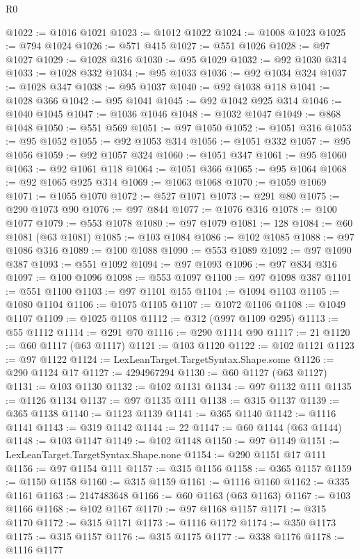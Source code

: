 \begin{lexlean}{R0}
\begin{coremodule}
@1022 := @1016 @1021
@1023 := @1012 @1022
@1024 := @1008 @1023
@1025 := @794 @1024
@1026 := @571 @415
@1027 := @551 @1026
@1028 := @97 @1027
@1029 := @1028 @316
@1030 := @95 @1029
@1032 := @92 @1030 @314
@1033 := @1028 @332
@1034 := @95 @1033
@1036 := @92 @1034 @324
@1037 := @1028 @347
@1038 := @95 @1037
@1040 := @92 @1038 @118
@1041 := @1028 @366
@1042 := @95 @1041
@1045 := @92 @1042 @925 @314
@1046 := @1040 @1045
@1047 := @1036 @1046
@1048 := @1032 @1047
@1049 := @868 @1048
@1050 := @551 @569
@1051 := @97 @1050
@1052 := @1051 @316
@1053 := @95 @1052
@1055 := @92 @1053 @314
@1056 := @1051 @332
@1057 := @95 @1056
@1059 := @92 @1057 @324
@1060 := @1051 @347
@1061 := @95 @1060
@1063 := @92 @1061 @118
@1064 := @1051 @366
@1065 := @95 @1064
@1068 := @92 @1065 @925 @314
@1069 := @1063 @1068
@1070 := @1059 @1069
@1071 := @1055 @1070
@1072 := @527 @1071
@1073 := @291 @80
@1075 := @290 @1073 @90
@1076 := @97 @844
@1077 := @1076 @316
@1078 := @100 @1077
@1079 := @553 @1078
@1080 := @97 @1079
@1081 := 128
@1084 := @60 @1081 (@63 @1081)
@1085 := @103 @1084
@1086 := @102 @1085
@1088 := @97 @1086 @316
@1089 := @100 @1088
@1090 := @553 @1089
@1092 := @97 @1090 @387
@1093 := @551 @1092
@1094 := @97 @1093
@1096 := @97 @834 @316
@1097 := @100 @1096
@1098 := @553 @1097
@1100 := @97 @1098 @387
@1101 := @551 @1100
@1103 := @97 @1101 @155
@1104 := @1094 @1103
@1105 := @1080 @1104
@1106 := @1075 @1105
@1107 := @1072 @1106
@1108 := @1049 @1107
@1109 := @1025 @1108
@1112 := @312 (@997 @1109 @295)
@1113 := @55 @1112
@1114 := @291 @70
@1116 := @290 @1114 @90
@1117 := 21
@1120 := @60 @1117 (@63 @1117)
@1121 := @103 @1120
@1122 := @102 @1121
@1123 := @97 @1122
@1124 := LexLeanTarget.TargetSyntax.Shape.some
@1126 := @290 @1124 @17
@1127 := 4294967294
@1130 := @60 @1127 (@63 @1127)
@1131 := @103 @1130
@1132 := @102 @1131
@1134 := @97 @1132 @111
@1135 := @1126 @1134
@1137 := @97 @1135 @111
@1138 := @315 @1137
@1139 := @365 @1138
@1140 := @1123 @1139
@1141 := @365 @1140
@1142 := @1116 @1141
@1143 := @319 @1142
@1144 := 22
@1147 := @60 @1144 (@63 @1144)
@1148 := @103 @1147
@1149 := @102 @1148
@1150 := @97 @1149
@1151 := LexLeanTarget.TargetSyntax.Shape.none
@1154 := @290 @1151 @17 @111
@1156 := @97 @1154 @111
@1157 := @315 @1156
@1158 := @365 @1157
@1159 := @1150 @1158
@1160 := @315 @1159
@1161 := @1116 @1160
@1162 := @335 @1161
@1163 := 2147483648
@1166 := @60 @1163 (@63 @1163)
@1167 := @103 @1166
@1168 := @102 @1167
@1170 := @97 @1168 @1157
@1171 := @315 @1170
@1172 := @315 @1171
@1173 := @1116 @1172
@1174 := @350 @1173
@1175 := @315 @1157
@1176 := @315 @1175
@1177 := @338 @1176
@1178 := @1116 @1177

\end{coremodule}
\end{lexlean}
